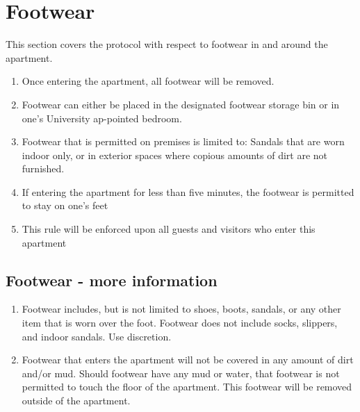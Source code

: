 \documentclass[10pt]{article}
\begin{document}
\section{Footwear}
This section covers the protocol with respect to footwear in and around the apartment.
\begin{enumerate}
	\item Once entering the apartment, all footwear will be removed.
	\item Footwear can either be placed in the designated footwear storage bin or in one’s University ap-pointed bedroom.
	\item Footwear that is permitted on premises is limited to: Sandals that are worn indoor only, or in exterior spaces where copious amounts of dirt are not furnished.
	\item If entering the apartment for less than five minutes, the footwear is permitted to stay on one’s feet
	\item This rule will be enforced upon all guests and visitors who enter this apartment
	
\end{enumerate}

\subsection{Footwear - more information}
\begin{enumerate}
	\item Footwear includes, but is not limited to shoes, boots, sandals, or any other item that is worn over the foot. Footwear does not include socks, slippers, and indoor sandals. Use discretion.
	\item Footwear that enters the apartment will not be covered in any amount of dirt and/or mud. Should footwear have any mud or water, that footwear is not permitted to touch the floor of the apartment. This footwear will be removed outside of the apartment.
	
\end{enumerate}
\end{document}
